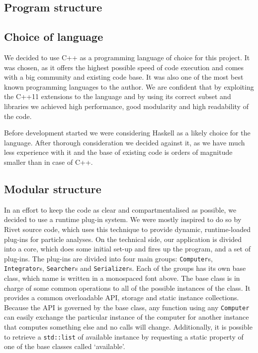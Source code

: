 \documentclass[11pt,a4paper]{article}
\begin{document}



\newpage
\begin{appendices}
    \section{Program structure}
    \subsection{Choice of language}
    We decided to use C++ as a programming language of choice for this project.
    It was chosen, as it offers the highest possible speed of code execution and comes with a big community and existing code base.
    It was also one of the most best known programming languages to the author.
    We are confident that by exploiting the C++11 extensions to the language and by using its correct subset and libraries we achieved high performance, good modularity and high readability of the code.

    Before development started we were considering Haskell as a likely choice for the language.
    After thorough consideration we decided against it, as we have much less experience with it and the base of existing code is orders of magnitude smaller than in case of C++.

    \subsection{Modular structure}
    In an effort to keep the code as clear and compartmentalised as possible, we decided to use a runtime plug-in system.
    We were mostly inspired to do so by Rivet\cite{Rivet13} source code, which uses this technique to provide dynamic, runtime-loaded plug-ins for particle analyses.
    On the technical side, our application is divided into a core, which does some initial set-up and fires up the program, and a set of plug-ins.
    The plug-ins are divided into four main groups: \texttt{Computer}s, \texttt{Integrator}s, \texttt{Searcher}s and \texttt{Serializer}s.
    Each of the groups has its own base class, which name is written in a monospaced font above.
    The base class is in charge of some common operations to all of the possible instances of the class.
    It provides a common overloadable API, storage and static instance collections.
    Because the API is governed by the base class, any function using any \texttt{Computer} can easily exchange the particular instance of the computer for another instance that computes something else and no calls will change.
    Additionally, it is possible to retrieve a \texttt{std::list} of available instance by requesting a static property of one of the base classes called `available'.


\end{appendices}
\end{document}
